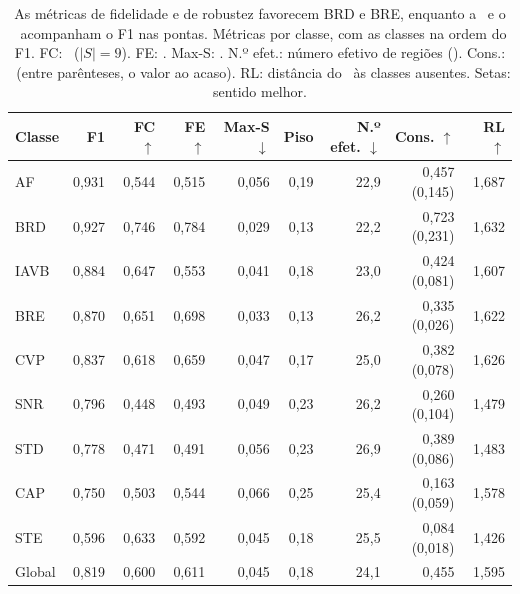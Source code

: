 \begin{table}[!t]\centering
\caption{As métricas de fidelidade e de robustez favorecem BRD e BRE, enquanto a \CS\ e o \RL\ acompanham o F1 nas pontas. Métricas por classe, com as classes na ordem do F1. FC: \FC\ ($|S| = 9$). FE: \FE. Max-S: \MS. N.º efet.: número efetivo de regiões (\CX). Cons.: \CS\ (entre parênteses, o valor ao acaso). RL: distância do \RL\ às classes ausentes. Setas: sentido melhor.}\label{tab:res}
\begin{tabular}{lrrrrrrrr}
\toprule
\textbf{Classe} & \textbf{F1} & \textbf{FC} $\uparrow$ & \textbf{FE} $\uparrow$ & \textbf{Max-S} $\downarrow$ & \textbf{Piso} & \textbf{N.º efet.} $\downarrow$ & \textbf{Cons.} $\uparrow$ & \textbf{RL} $\uparrow$ \\
\midrule
AF   & 0,931 & 0,544 & 0,515 & 0,056 & 0,19 & 22,9 & 0,457 (0,145) & 1,687 \\
BRD  & 0,927 & 0,746 & 0,784 & 0,029 & 0,13 & 22,2 & 0,723 (0,231) & 1,632 \\
IAVB & 0,884 & 0,647 & 0,553 & 0,041 & 0,18 & 23,0 & 0,424 (0,081) & 1,607 \\
BRE  & 0,870 & 0,651 & 0,698 & 0,033 & 0,13 & 26,2 & 0,335 (0,026) & 1,622 \\
CVP  & 0,837 & 0,618 & 0,659 & 0,047 & 0,17 & 25,0 & 0,382 (0,078) & 1,626 \\
SNR  & 0,796 & 0,448 & 0,493 & 0,049 & 0,23 & 26,2 & 0,260 (0,104) & 1,479 \\
STD  & 0,778 & 0,471 & 0,491 & 0,056 & 0,23 & 26,9 & 0,389 (0,086) & 1,483 \\
CAP  & 0,750 & 0,503 & 0,544 & 0,066 & 0,25 & 25,4 & 0,163 (0,059) & 1,578 \\
STE  & 0,596 & 0,633 & 0,592 & 0,045 & 0,18 & 25,5 & 0,084 (0,018) & 1,426 \\
\midrule
Global & 0,819 & 0,600 & 0,611 & 0,045 & 0,18 & 24,1 & 0,455 & 1,595 \\
\bottomrule
\end{tabular}
\end{table}

